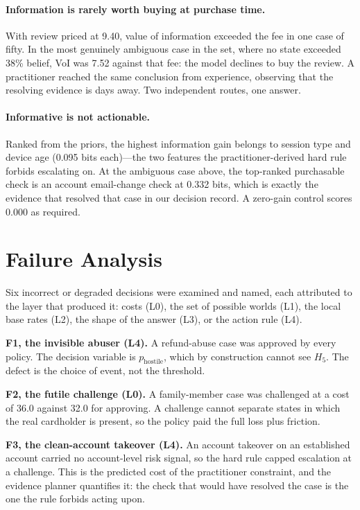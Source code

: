 \documentclass{article}
\begin{document}
\paragraph{Information is rarely worth buying at purchase time.} With review priced at 9.40,
value of information exceeded the fee in one case of fifty. In the most genuinely ambiguous
case in the set, where no state exceeded 38\% belief, VoI was 7.52 against that fee: the
model declines to buy the review. A practitioner reached the same conclusion from
experience, observing that the resolving evidence is days away. Two independent routes, one
answer.

\paragraph{Informative is not actionable.} Ranked from the priors, the highest information
gain belongs to session type and device age (0.095 bits each)---the two features the
practitioner-derived hard rule forbids escalating on. At the ambiguous case above, the
top-ranked purchasable check is an account email-change check at 0.332 bits, which is
exactly the evidence that resolved that case in our decision record. A zero-gain control
scores 0.000 as required.

\section{Failure Analysis}
\label{sec:failures}

Six incorrect or degraded decisions were examined and named, each attributed to the layer
that produced it: costs (L0), the set of possible worlds (L1), the local base rates (L2),
the shape of the answer (L3), or the action rule (L4).

\textbf{F1, the invisible abuser (L4).} A refund-abuse case was approved by every policy.
The decision variable is $p_{\text{hostile}}$, which by construction cannot see $H_5$. The
defect is the choice of event, not the threshold.

\textbf{F2, the futile challenge (L0).} A family-member case was challenged at a cost of
36.0 against 32.0 for approving. A challenge cannot separate states in which the real
cardholder is present, so the policy paid the full loss plus friction.

\textbf{F3, the clean-account takeover (L4).} An account takeover on an established account
carried no account-level risk signal, so the hard rule capped escalation at a challenge.
This is the predicted cost of the practitioner constraint, and the evidence planner
quantifies it: the check that would have resolved the case is the one the rule forbids
acting upon.
\end{document}
